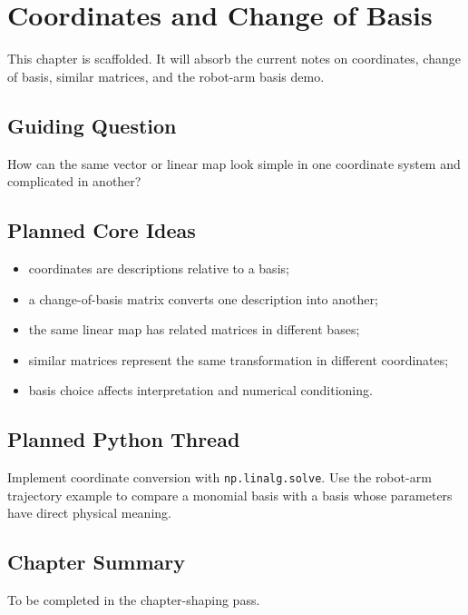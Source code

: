 \chapter{Coordinates and Change of Basis}
\label{ch:coordinates-change-basis}

\begin{draftbox}
This chapter is scaffolded. It will absorb the current notes on coordinates,
change of basis, similar matrices, and the robot-arm basis demo.
\end{draftbox}

\section{Guiding Question}

How can the same vector or linear map look simple in one coordinate system and
complicated in another?

\section{Planned Core Ideas}

\begin{itemize}
  \item coordinates are descriptions relative to a basis;
  \item a change-of-basis matrix converts one description into another;
  \item the same linear map has related matrices in different bases;
  \item similar matrices represent the same transformation in different
    coordinates;
  \item basis choice affects interpretation and numerical conditioning.
\end{itemize}

\section{Planned Python Thread}

Implement coordinate conversion with \texttt{np.linalg.solve}. Use the
robot-arm trajectory example to compare a monomial basis with a basis whose
parameters have direct physical meaning.

\section*{Chapter Summary}

To be completed in the chapter-shaping pass.


